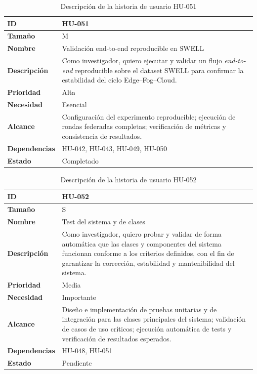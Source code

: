 \documentclass{report}
\begin{document}
\begin{table}[H]
\centering
\caption{Descripción de la historia de usuario HU-051}
\label{tab:hu051}
\begin{tabular}{|l|p{12cm}|}
\hline
\textbf{ID} & HU-051 \\ \hline
\textbf{Tamaño} & M \\ \hline
\textbf{Nombre} & Validación end-to-end reproducible en SWELL \\ \hline
\textbf{Descripción} &
Como investigador, quiero ejecutar y validar un flujo \textit{end-to-end} reproducible sobre el dataset SWELL para confirmar la estabilidad del ciclo Edge--Fog--Cloud. \\ \hline
\textbf{Prioridad} & Alta \\ \hline
\textbf{Necesidad} & Esencial \\ \hline
\textbf{Alcance} &
Configuración del experimento reproducible; ejecución de rondas federadas completas; verificación de métricas y consistencia de resultados. \\ \hline
\textbf{Dependencias} & HU-042, HU-043, HU-049, HU-050 \\ \hline
\textbf{Estado} & Completado \\ \hline
\end{tabular}
\end{table}



\begin{table}[H]
\centering
\caption{Descripción de la historia de usuario HU-052}
\label{tab:hu052}
\begin{tabular}{|l|p{12cm}|}
\hline
\textbf{ID} & HU-052 \\ \hline
\textbf{Tamaño} & S \\ \hline
\textbf{Nombre} & Test del sistema y de clases \\ \hline
\textbf{Descripción} &
Como investigador, quiero probar y validar de forma automática que las clases y componentes del sistema funcionan conforme a los criterios definidos, con el fin de garantizar la corrección, estabilidad y mantenibilidad del sistema. \\ \hline
\textbf{Prioridad} & Media \\ \hline
\textbf{Necesidad} & Importante \\ \hline
\textbf{Alcance} &
Diseño e implementación de pruebas unitarias y de integración para las clases principales del sistema; validación de casos de uso críticos; ejecución automática de tests y verificación de resultados esperados. \\ \hline
\textbf{Dependencias} & HU-048, HU-051 \\ \hline
\textbf{Estado} & Pendiente \\ \hline
\end{tabular}
\end{table}
\end{document}
